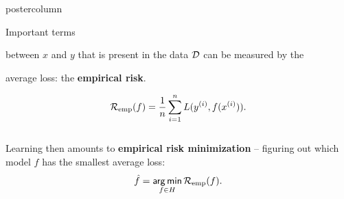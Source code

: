 \documentclass{beamer}
\begin{document}
\begin{frame}[fragile]{}
\begin{columns}
\begin{column}{.31\textwidth}
\begin{beamercolorbox}[center]{postercolumn}
\begin{minipage}{.98\textwidth}
{\begin{myblock}{Important terms}
						\begin{codebox}
							 between $x$ and $y$ that is present in the data $\mathcal{D}$ can be measured by the
						\end{codebox}
						\begin{codebox}
							average loss: the \textbf{empirical risk}.
						\end{codebox}
						$$\mathcal{R}_{\text{emp}}(f) = \frac{1}{n} \sum_{i=1}^n L(y^{(i)}, f(x^{(i)})).$$
						\\
						\hspace*{1ex}Learning then amounts to \textbf{empirical risk minimization} -- figuring out \hspace*{1ex}which model $f$ has the smallest average loss:$$\hat{f} = \mathop{\sf arg\,min}_{f \in H} \mathcal{R}_{\text{emp}}(f).$$
					\end{myblock}
				}
			\end{minipage}
		\end{beamercolorbox}
	\end{column}
\end{columns}
\end{frame}
\end{document}
